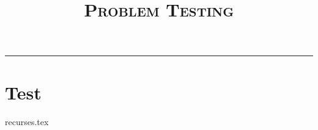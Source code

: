 \documentclass{exam}
\title{\textsc{Problem Testing}}
\begin{document}
\maketitle
\rule{\textwidth}{0.15em}
\fontsize{12}{15}\selectfont

\section{Test}
\begin{questions}
{recurses.tex}
\end{questions}
\end{document}
